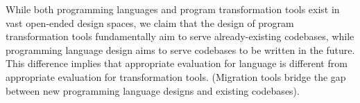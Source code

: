 While both programming languages and program transformation tools exist
in vast open-ended design spaces, we claim that the design of program transformation
tools fundamentally aim to serve already-existing codebases, while programming 
language design aims to serve codebases to be written in the future.
This difference implies that appropriate evaluation for language is different 
from appropriate evaluation for transformation tools.
(Migration tools bridge the gap between new programming language designs
and existing codebases).


